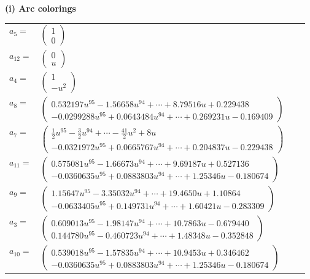 \documentclass[1p]{elsarticle_modified}
\theoremstyle{definition}
\begin{document}
\flushleft \textbf{(i) Arc colorings}\\
\begin{tabular}{m{7pt} m{180pt} m{7pt} m{180pt} }
\flushright $a_{5}=$&$\begin{pmatrix}1\\0\end{pmatrix}$ \\
\flushright $a_{12}=$&$\begin{pmatrix}0\\u\end{pmatrix}$ \\
\flushright $a_{4}=$&$\begin{pmatrix}1\\- u^2\end{pmatrix}$ \\
\flushright $a_{8}=$&$\begin{pmatrix}0.532197 u^{95}-1.56658 u^{94}+\cdots+8.79516 u+0.229438\\-0.0299288 u^{95}+0.0643484 u^{94}+\cdots+0.269231 u-0.169409\end{pmatrix}$ \\
\flushright $a_{7}=$&$\begin{pmatrix}\frac{1}{2} u^{95}-\frac{3}{2} u^{94}+\cdots-\frac{41}{2} u^2+8 u\\-0.0321972 u^{95}+0.0665767 u^{94}+\cdots+0.204837 u-0.229438\end{pmatrix}$ \\
\flushright $a_{11}=$&$\begin{pmatrix}0.575081 u^{95}-1.66673 u^{94}+\cdots+9.69187 u+0.527136\\-0.0360635 u^{95}+0.0883803 u^{94}+\cdots+1.25346 u-0.180674\end{pmatrix}$ \\
\flushright $a_{9}=$&$\begin{pmatrix}1.15647 u^{95}-3.35032 u^{94}+\cdots+19.4650 u+1.10864\\-0.0633405 u^{95}+0.149731 u^{94}+\cdots+1.60421 u-0.283309\end{pmatrix}$ \\
\flushright $a_{3}=$&$\begin{pmatrix}0.609013 u^{95}-1.98147 u^{94}+\cdots+10.7863 u-0.679440\\0.144780 u^{95}-0.460723 u^{94}+\cdots+1.48348 u-0.352848\end{pmatrix}$ \\
\flushright $a_{10}=$&$\begin{pmatrix}0.539018 u^{95}-1.57835 u^{94}+\cdots+10.9453 u+0.346462\\-0.0360635 u^{95}+0.0883803 u^{94}+\cdots+1.25346 u-0.180674\end{pmatrix}$ \\

\end{tabular}
\end{document}

